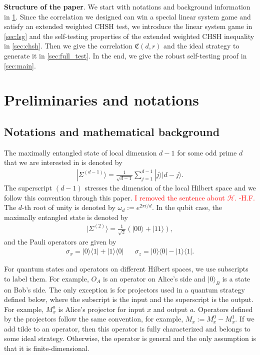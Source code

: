 \documentclass[11pt,letterpaper]{article}
\newcommand{\ket}[1]{|#1\rangle}
\newcommand{\ketbra}[2]{|#1\rangle\langle#2|}
\newcommand{\calH}{\mathcal{H}}
\newcommand{\1}{\mathbb{1}}
\newcommand{\EPR}[1]{\Sigma^{(#1)}}
\newcommand{\paulix}{\sigma_x}
\newcommand{\pauliz}{\sigma_z}
\newcommand{\fC}{\mathfrak{C}}
\newcommand{\hfc}[1]{\textcolor{red}{#1 -H.F.}}
\theoremstyle{definition}
\begin{document}
\textbf{Structure of the paper}.
We start with notations and background information in \cref{sec:prelim}.
Since the correlation we designed can win a special linear system game and satisfy
an extended weighted CHSH test, we introduce the linear system game
in \cref{sec:lsg} and the self-testing properties of the extended weighted CHSH inequality in \cref{sec:chsh}. 
Then we give the correlation $\fC(d,r)$ and the ideal strategy to generate it in \cref{sec:full_test}.
In the end, we give the robust self-testing proof in \cref{sec:main}. 

\section{Preliminaries and notations}
\label{sec:prelim}
\subsection{Notations and mathematical background}
The maximally entangled state of local dimension $d-1$ for some odd prime $d$ that we are interested in is denoted by
\begin{align}
\ket{\EPR{d-1}} = \frac{1}{\sqrt{d-1}} \sum_{j = 1}^{d-1} \ket{j}\ket{d-j}.
\end{align}
The superscript $(d-1)$ stresses the dimension of the local Hilbert space and we follow this convention through this paper.
\hfc{I removed the sentence about $\calH$.}
The $d$-th root of unity is denoted by $\omega_d:=e^{2\pi i/d}$. In the qubit case, 
the maximally entangled state is denoted by 
\begin{align}
	\ket{\EPR{2}} = \frac{1}{\sqrt{2}}(\ket{00} + \ket{11}),
\end{align}
and the Pauli operators are given by
\begin{align}
	\paulix = \ketbra{0}{1}+\ketbra{1}{0} && \pauliz = \ketbra{0}{0} - \ketbra{1}{1}.
\end{align}

For quantum states and operators on different Hilbert spaces, we use subscripts to label them.
For example, $O_A$ is an operator on Alice's side and $\ket{0}_{B}$ is a state on Bob's side. 
The only exception is for projectors used in a quantum strategy defined below, where the subscript 
is the input and the superscript is the output. For example, $M_x^a$ is Alice's projector for input $x$ and output $a$.
Operators defined by the projectors follow the same convention, for example, $M_x := M_x^0 - M_x^1$.
If we add tilde to an operator, then this operator is fully characterized and belongs to some ideal strategy.
Otherwise, the operator is general and the only assumption is that it is finite-dimensional.
\end{document}
